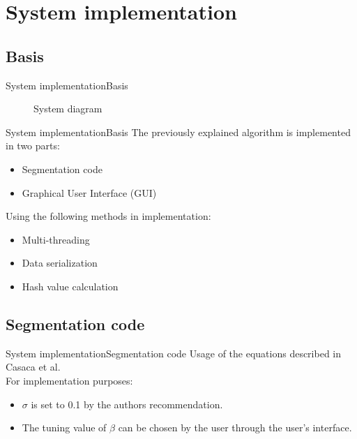 \documentclass[10pt]{beamer}
\begin{document}
\section{System implementation}
\subsection{Basis}
\begin{frame}{System implementation}{Basis}
\begin{figure}
  \centering
  \caption{System diagram}
  \end{figure}
\end{frame}

\begin{frame}{System implementation}{Basis}
The previously explained algorithm is implemented in two parts:
  \begin{itemize}
      \item Segmentation code
      \item Graphical User Interface (GUI)
  \end{itemize}
  \vspace{0.3in}
Using the following methods in implementation:
\begin{itemize}
	\item Multi-threading
    \item Data serialization
    \item Hash value calculation
\end{itemize}
\end{frame}
\subsection{Segmentation code}
\begin{frame} {System implementation}{Segmentation code}
Usage of the equations described in Casaca et al. \\
\vspace{0.4cm}
For implementation purposes:
\begin{itemize}
\item $\sigma$ is set to 0.1 by the authors recommendation. 
\item The tuning value of $\beta$ can be chosen by the user through the user's interface. 
\end{itemize}
\end{frame}
\end{document}
